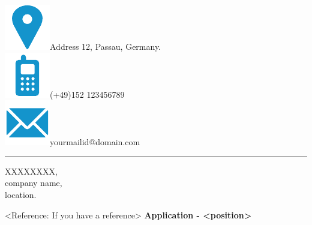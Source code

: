 \documentclass[bigfont, nodocument,nologo,black]{europasscv}
\newcommand{\locationGraphics}{\includegraphics[scale=0.22]{address_europass_icon.pdf}}%
\newcommand{\mobileGraphics}{\includegraphics[scale=0.22]{mobile_europass_icon.pdf}}%
\newcommand{\mailGraphics}{\includegraphics[scale=0.22]{mail_europass_icon.pdf}}%
\begin{document}
	

\ecvLeftColumnWidth{0mm}
\hspace*{-1cm}
\ecvLeftColumnWidth{0mm}
\ecvColSep{0pt}
\begin{minipage}{\linewidth}
  \begin{europasscv}
	
	\locationGraphics{Address 12, Passau, Germany.}\\
	\mobileGraphics{(+49)152 123456789} \\
	\mailGraphics{yourmailid@domain.com}\\
	\bigbreak
	\noindent\textcolor{ecvrulecolor}{\rule{\linewidth}{0.5mm}}
    \bigbreak
    
   \end{europasscv}
\end{minipage}

\ecvLeftColumnWidth{0mm}
\hspace*{-1cm}
\ecvLeftColumnWidth{0mm}
\ecvColSep{0pt}
\begin{minipage}{\linewidth}
	\begin{europasscv}

		XXXXXXXX, \\
		company name, \\
		location. \\
		\bigbreak
	\end{europasscv}
\end{minipage}

\ecvLeftColumnWidth{0mm}
\hspace*{-1cm}
\ecvLeftColumnWidth{0mm}
\ecvColSep{0pt}
\begin{minipage}{\linewidth}
	\begin{europasscv}
		
		<Reference: If you have a reference> 
		\bigbreak
		\textbf{Application - <position>}
		    
	\end{europasscv}
\end{minipage}
\end{document}
